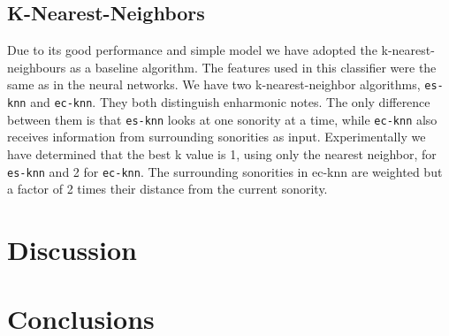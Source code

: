 \documentclass{article}
\newcommand{\comment}[1]{}
\begin{document}
\subsection{K-Nearest-Neighbors}
\label{sec:knn}

\comment{
  ==> baseline (similar a pardo, templates automaticos)
  ==> good theoretical performance (citar \cite{fix.ea:important}) 
  ==> very good practical performance (citar
  \cite{gomez.ea:estimating})
  ==> dizer valor de k, peso do contexto
}

Due to its good performance \cite{fix.ea:important,
  gomez.ea:estimating} and simple model we have adopted the
k-nearest-neighbours as a baseline algorithm. The features used in
this classifier were the same as in the neural networks. We have two
k-nearest-neighbor algorithms, \texttt{es-knn} and
\texttt{ec-knn}. They both distinguish enharmonic notes. The only
difference between them is that \texttt{es-knn} looks at one sonority
at a time, while \texttt{ec-knn} also receives information from
surrounding sonorities as input. Experimentally we have determined
that the best k value is 1, using only the nearest neighbor, for
\texttt{es-knn} and 2 for \texttt{ec-knn}. The surrounding sonorities
in ec-knn are weighted but a factor of 2 times their distance from the
current sonority.

\section{Discussion}
\label{sec:discussion}



\section{Conclusions}
\label{sec:conclusions}




\end{document}
